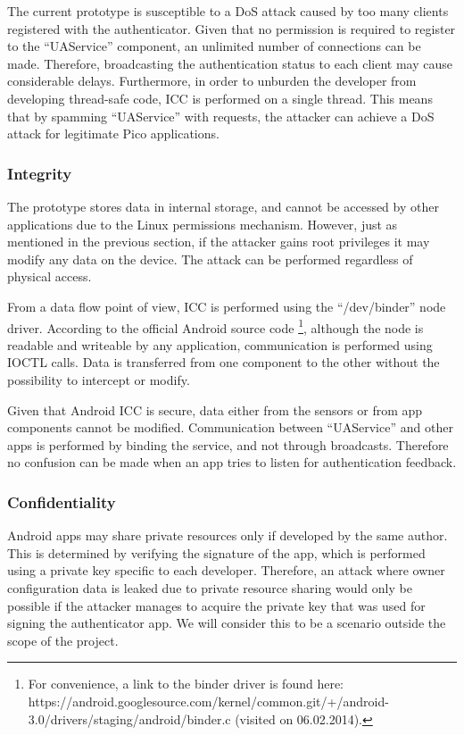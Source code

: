 The current prototype is susceptible to a DoS attack caused by too many clients registered with the authenticator. Given that no permission is required to register to the ``UAService'' component, an unlimited number of connections can be made. Therefore, broadcasting the authentication status to each client may cause considerable delays. Furthermore, in order to unburden the developer from developing thread-safe code, ICC is performed on a single thread. This means that by spamming ``UAService'' with requests, the attacker can achieve a DoS attack for legitimate Pico applications.

\subsubsection*{Integrity}
The prototype stores data in internal storage, and cannot be accessed by other applications due to the Linux permissions mechanism. However, just as mentioned in the previous section, if the attacker gains root privileges it may modify any data on the device. The attack can be performed regardless of physical access.

From a data flow point of view, ICC is performed using the ``/dev/binder'' node driver. According to the official Android source code \footnote{For convenience, a link to the binder driver is found here: https://android.googlesource.com/kernel/common.git/+/android-3.0/drivers/staging/android/binder.c (visited on 06.02.2014).}, although the node is readable and writeable by any application, communication is performed using IOCTL calls. Data is transferred from one component to the other without the possibility to intercept or modify. 

Given that Android ICC is secure, data either from the sensors or from app components cannot be modified. Communication between ``UAService'' and other apps is performed by binding the service, and not through broadcasts. Therefore no confusion can be made when an app tries to listen for authentication feedback.

\subsubsection*{Confidentiality}
Android apps may share private resources only if developed by the same author. This is determined by verifying the signature of the app, which is performed using a private key specific to each developer. Therefore, an attack where owner configuration data is leaked due to private resource sharing would only be possible if the attacker manages to acquire the private key that was used for signing the authenticator app. We will consider this to be a scenario outside the scope of the project.

